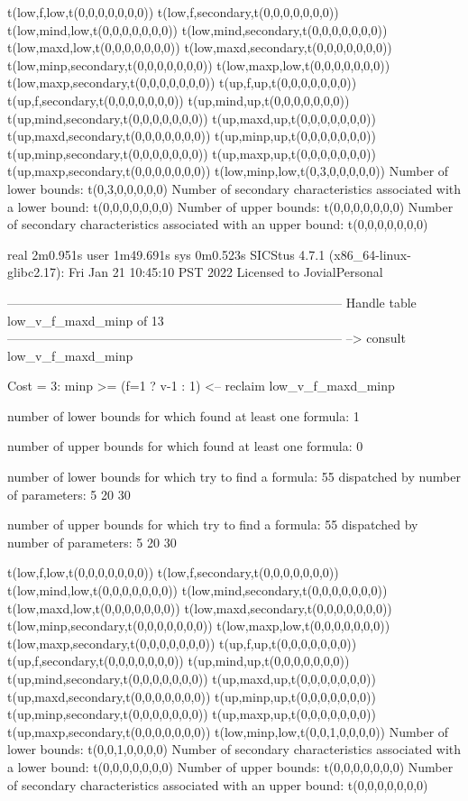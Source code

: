 t(low,f,low,t(0,0,0,0,0,0,0))
t(low,f,secondary,t(0,0,0,0,0,0,0))
t(low,mind,low,t(0,0,0,0,0,0,0))
t(low,mind,secondary,t(0,0,0,0,0,0,0))
t(low,maxd,low,t(0,0,0,0,0,0,0))
t(low,maxd,secondary,t(0,0,0,0,0,0,0))
t(low,minp,secondary,t(0,0,0,0,0,0,0))
t(low,maxp,low,t(0,0,0,0,0,0,0))
t(low,maxp,secondary,t(0,0,0,0,0,0,0))
t(up,f,up,t(0,0,0,0,0,0,0))
t(up,f,secondary,t(0,0,0,0,0,0,0))
t(up,mind,up,t(0,0,0,0,0,0,0))
t(up,mind,secondary,t(0,0,0,0,0,0,0))
t(up,maxd,up,t(0,0,0,0,0,0,0))
t(up,maxd,secondary,t(0,0,0,0,0,0,0))
t(up,minp,up,t(0,0,0,0,0,0,0))
t(up,minp,secondary,t(0,0,0,0,0,0,0))
t(up,maxp,up,t(0,0,0,0,0,0,0))
t(up,maxp,secondary,t(0,0,0,0,0,0,0))
t(low,minp,low,t(0,3,0,0,0,0,0))
Number of lower bounds:                                             t(0,3,0,0,0,0,0)
Number of secondary characteristics associated with a lower bound:  t(0,0,0,0,0,0,0)
Number of upper bounds:                                             t(0,0,0,0,0,0,0)
Number of secondary characteristics associated with an upper bound: t(0,0,0,0,0,0,0)

real	2m0.951s
user	1m49.691s
sys	0m0.523s
SICStus 4.7.1 (x86_64-linux-glibc2.17): Fri Jan 21 10:45:10 PST 2022
Licensed to JovialPersonal


--------------------------------------------------------------------------------
Handle table low_v_f_maxd_minp of 13
--------------------------------------------------------------------------------
--> consult low_v_f_maxd_minp

Cost =  3:  minp >= (f=1 ? v-1 : 1)
<-- reclaim low_v_f_maxd_minp

number of lower bounds for which found at least one formula: 1

number of upper bounds for which found at least one formula: 0

number of lower bounds for which try to find a formula: 55
dispatched by number of parameters: 5  20  30

number of upper bounds for which try to find a formula: 55
dispatched by number of parameters: 5  20  30

t(low,f,low,t(0,0,0,0,0,0,0))
t(low,f,secondary,t(0,0,0,0,0,0,0))
t(low,mind,low,t(0,0,0,0,0,0,0))
t(low,mind,secondary,t(0,0,0,0,0,0,0))
t(low,maxd,low,t(0,0,0,0,0,0,0))
t(low,maxd,secondary,t(0,0,0,0,0,0,0))
t(low,minp,secondary,t(0,0,0,0,0,0,0))
t(low,maxp,low,t(0,0,0,0,0,0,0))
t(low,maxp,secondary,t(0,0,0,0,0,0,0))
t(up,f,up,t(0,0,0,0,0,0,0))
t(up,f,secondary,t(0,0,0,0,0,0,0))
t(up,mind,up,t(0,0,0,0,0,0,0))
t(up,mind,secondary,t(0,0,0,0,0,0,0))
t(up,maxd,up,t(0,0,0,0,0,0,0))
t(up,maxd,secondary,t(0,0,0,0,0,0,0))
t(up,minp,up,t(0,0,0,0,0,0,0))
t(up,minp,secondary,t(0,0,0,0,0,0,0))
t(up,maxp,up,t(0,0,0,0,0,0,0))
t(up,maxp,secondary,t(0,0,0,0,0,0,0))
t(low,minp,low,t(0,0,1,0,0,0,0))
Number of lower bounds:                                             t(0,0,1,0,0,0,0)
Number of secondary characteristics associated with a lower bound:  t(0,0,0,0,0,0,0)
Number of upper bounds:                                             t(0,0,0,0,0,0,0)
Number of secondary characteristics associated with an upper bound: t(0,0,0,0,0,0,0)

